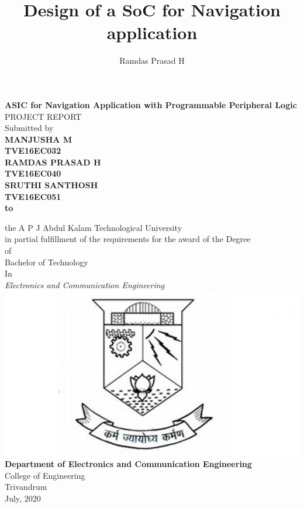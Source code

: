 \documentclass[12pt,a4paper]{report}
\author{Ramdas Prasad H}
\title{Design of a SoC for Navigation application }
\begin{document}
\pagestyle{empty}
\begin{center}
{\Large \textbf{ASIC for Navigation Application with Programmable Peripheral Logic}}\\
\vspace{0.2cm}
PROJECT REPORT\\
\vspace{0.2cm}
Submitted by \\
\vspace{0.2cm}
\textbf{MANJUSHA M}\\
\textbf{TVE16EC032}\\
\vspace{0.12cm}
\textbf{RAMDAS PRASAD H}\\
\textbf{TVE16EC040}\\
\vspace{0.12cm}
\textbf{SRUTHI SANTHOSH}\\
\textbf{TVE16EC051}\\
\vspace{0.12cm}
\textbf{to}\\
\vspace{0.12cm}

 the A P J Abdul Kalam Technological University \\
in partial fulfillment of the requirements for the award of the Degree \\
of\\
Bachelor of Technology \\
In\\
\textit{Electronics and Communication Engineering}\\
\includegraphics[scale=0.6]{CET_logo.jpeg}\\
\textbf{Department of Electronics and Communication Engineering}\\
College of Engineering\\
Trivandrum\\
July, 2020
\end{center}
\end{document}

